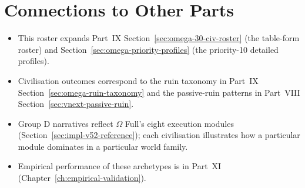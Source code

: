 \section*{Connections to Other Parts}

\begin{itemize}
\item This roster expands Part~IX
Section~\ref{sec:omega-30-civ-roster} (the table-form roster) and
Section~\ref{sec:omega-priority-profiles} (the priority-10 detailed
profiles).
\item Civilisation outcomes correspond to the ruin taxonomy in
Part~IX Section~\ref{sec:omega-ruin-taxonomy} and the passive-ruin
patterns in Part~VIII Section~\ref{sec:vnext-passive-ruin}.
\item Group D narratives reflect $\Omega$ Full's eight execution
modules
(Section~\ref{sec:impl-v52-reference}); each civilisation
illustrates how a particular module dominates in a particular
world family.
\item Empirical performance of these archetypes is in Part~XI
(Chapter~\ref{ch:empirical-validation}).
\end{itemize}
